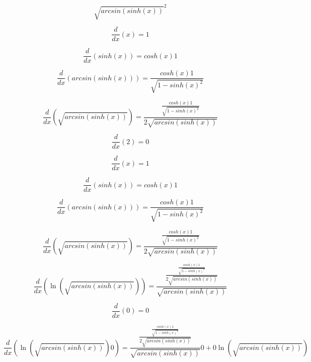 \documentclass{article}
\begin{document}
\begin{equation}
{\sqrt{arcsin(sinh(x))}}^{2}
\end{equation}

\begin{equation}
\frac{d}{dx}(x) = 1
\end{equation}

\begin{equation}
\frac{d}{dx}(sinh(x)) = cosh(x)1
\end{equation}

\begin{equation}
\frac{d}{dx}(arcsin(sinh(x))) = \frac{cosh(x)1}{\sqrt{1-{sinh(x)}^{2}}}
\end{equation}

\begin{equation}
\frac{d}{dx}(\sqrt{arcsin(sinh(x))}) = \frac{\frac{cosh(x)1}{\sqrt{1-{sinh(x)}^{2}}}}{2\sqrt{arcsin(sinh(x))}}
\end{equation}

\begin{equation}
\frac{d}{dx}(2) = 0
\end{equation}

\begin{equation}
\frac{d}{dx}(x) = 1
\end{equation}

\begin{equation}
\frac{d}{dx}(sinh(x)) = cosh(x)1
\end{equation}

\begin{equation}
\frac{d}{dx}(arcsin(sinh(x))) = \frac{cosh(x)1}{\sqrt{1-{sinh(x)}^{2}}}
\end{equation}

\begin{equation}
\frac{d}{dx}(\sqrt{arcsin(sinh(x))}) = \frac{\frac{cosh(x)1}{\sqrt{1-{sinh(x)}^{2}}}}{2\sqrt{arcsin(sinh(x))}}
\end{equation}

\begin{equation}
\frac{d}{dx}(\ln(\sqrt{arcsin(sinh(x))})) = \frac{\frac{\frac{cosh(x)1}{\sqrt{1-{sinh(x)}^{2}}}}{2\sqrt{arcsin(sinh(x))}}}{\sqrt{arcsin(sinh(x))}}
\end{equation}

\begin{equation}
\frac{d}{dx}(0) = 0
\end{equation}

\begin{equation}
\frac{d}{dx}(\ln(\sqrt{arcsin(sinh(x))})0) = \frac{\frac{\frac{cosh(x)1}{\sqrt{1-{sinh(x)}^{2}}}}{2\sqrt{arcsin(sinh(x))}}}{\sqrt{arcsin(sinh(x))}}0+0\ln(\sqrt{arcsin(sinh(x))})
\end{equation}
\end{document}
